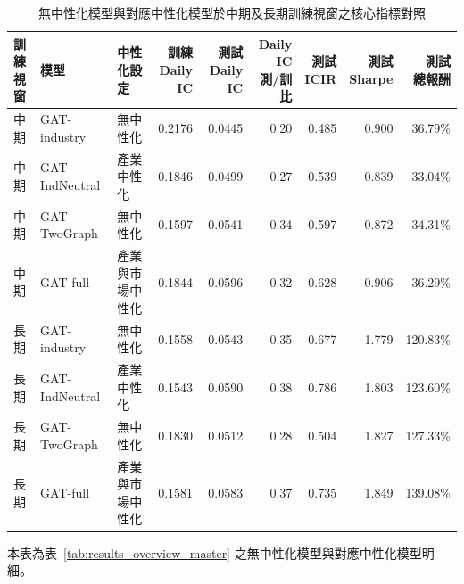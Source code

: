 \begin{table}[H]
\centering
\caption{無中性化模型與對應中性化模型於中期及長期訓練視窗之核心指標對照}
\label{tab:results_dmfm_tradeoff}
\begingroup
\scriptsize
\setlength{\tabcolsep}{4pt}
\renewcommand{\arraystretch}{1.10}
\begin{adjustbox}{max width=\textwidth}
\begin{tabular}{@{}lllrrrrrr@{}}
\toprule
\makecell[l]{訓練\\視窗} & 模型 & 中性化設定 & \makecell[r]{訓練\\Daily IC} & \makecell[r]{測試\\Daily IC} & \makecell[r]{Daily IC\\測/訓比} & \makecell[r]{測試\\ICIR} & \makecell[r]{測試\\Sharpe} & \makecell[r]{測試\\總報酬} \\
\midrule
中期 & GAT-industry & 無中性化 & 0.2176 & 0.0445 & 0.20 & 0.485 & 0.900 & 36.79\% \\
中期 & GAT-IndNeutral & 產業中性化 & 0.1846 & 0.0499 & 0.27 & 0.539 & 0.839 & 33.04\% \\
\addlinespace
中期 & GAT-TwoGraph & 無中性化 & 0.1597 & 0.0541 & 0.34 & 0.597 & 0.872 & 34.31\% \\
中期 & GAT-full & 產業與市場中性化 & 0.1844 & 0.0596 & 0.32 & 0.628 & 0.906 & 36.29\% \\
\midrule
長期 & GAT-industry & 無中性化 & 0.1558 & 0.0543 & 0.35 & 0.677 & 1.779 & 120.83\% \\
長期 & GAT-IndNeutral & 產業中性化 & 0.1543 & 0.0590 & 0.38 & 0.786 & 1.803 & 123.60\% \\
\addlinespace
長期 & GAT-TwoGraph & 無中性化 & 0.1830 & 0.0512 & 0.28 & 0.504 & 1.827 & 127.33\% \\
長期 & GAT-full & 產業與市場中性化 & 0.1581 & 0.0583 & 0.37 & 0.735 & 1.849 & 139.08\% \\
\bottomrule
\end{tabular}
\end{adjustbox}
\smallskip

{\footnotesize 本表為表~\ref{tab:results_overview_master} 之無中性化模型與對應中性化模型明細。}
\endgroup
\end{table}
